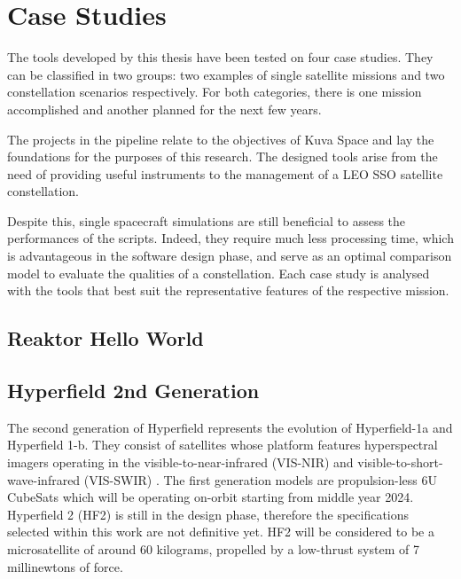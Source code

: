 \chapter{Case Studies} \label{case_studies_chapter}
The tools developed by this thesis have been tested on four case studies. 
They can be classified in two groups: two examples of single satellite missions and two constellation scenarios respectively.
For both categories, there is one mission accomplished and another planned for the next few years.

The projects in the pipeline relate to the objectives of Kuva Space and lay the foundations for the purposes of this research.
The designed tools arise from the need of providing useful instruments to the management of a LEO SSO satellite constellation.

Despite this, single spacecraft simulations are still beneficial to assess the performances of the scripts.
Indeed, they require much less processing time, which is advantageous in the software design phase, and serve as an optimal comparison model to evaluate the qualities of a constellation. 
Each case study is analysed with the tools that best suit the representative features of the respective mission.



\section{Reaktor Hello World} \label{reaktor_hw_par}




\section{Hyperfield 2nd Generation} \label{hf_nextgen_par}
The second generation of Hyperfield represents the evolution of Hyperfield-1a and Hyperfield 1-b.
They consist of satellites whose platform features hyperspectral imagers operating in the visible-to-near-infrared (VIS-NIR) and visible-to-short-wave-infrared (VIS-SWIR) \cite{tikka2023hyperfield}.
The first generation models are propulsion-less 6U CubeSats which will be operating on-orbit starting from middle year 2024.
Hyperfield 2 (HF2) is still in the design phase, therefore the specifications selected within this work are not definitive yet. 
HF2 will be considered to be a microsatellite of around 60 kilograms, propelled by a low-thrust system of 7 millinewtons of force.

